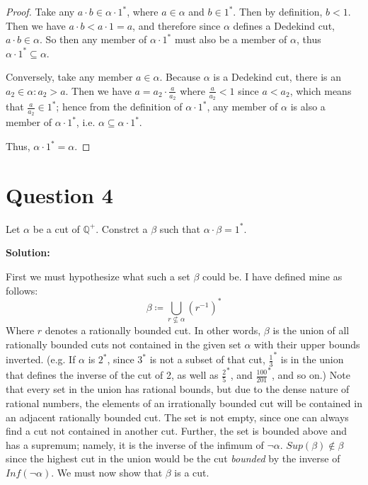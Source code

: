 \documentclass[12pt, letterpaper]{article}
\begin{document}
\begin{proof}

\noindent Take any $a \cdot b \in \alpha \cdot 1^*$, where $a \in \alpha$ and $b \in 1^*$. Then by definition, $b < 1$. Then we have $a \cdot b < a \cdot 1 = a$,
and therefore since $\alpha$ defines a Dedekind cut, $a \cdot b \in \alpha$. So then any member of $\alpha \cdot 1^*$ must also be a member of $\alpha$, thus
$\alpha \cdot 1^* \subseteq \alpha$.

\noindent Conversely, take any member $a \in \alpha$. Because $\alpha$ is a Dedekind cut, there is an $a_2 \in \alpha : a_2 > a$.
Then we have $a = a_2 \cdot \frac{a}{a_2}$ where $\frac{a}{a_2} < 1$ since $a < a_2$, which means that $\frac{a}{a_2} \in 1^*$; hence from the definition of $\alpha \cdot 1^*$, any member of
$\alpha$ is also a member of $\alpha \cdot 1^*$, i.e. $\alpha \subseteq \alpha \cdot 1^*$.

\noindent Thus, $\alpha \cdot 1^* = \alpha$.

\end{proof}
\pagebreak
\section*{Question 4}
Let $\alpha$ be a cut of $\mathbb{Q}^+$. Constrct a $\beta$ such that $\alpha \cdot \beta = 1^*$.

\noindent\textbf{Solution:}

\noindent First we must hypothesize what such a set $\beta$ could be. I have defined mine as follows:
$$\beta \coloneqq \bigcup\limits_{r \nsubseteq \alpha} (r^{-1})^*$$
Where $r$ denotes a rationally bounded cut. In other words, $\beta$ is the union of all rationally bounded cuts not contained in the given set $\alpha$ with their upper bounds inverted.
(e.g. If $\alpha$ is $2^*$, since $3^*$ is not a subset of that cut, $\frac{1}{3}^*$
is in the union that defines the inverse of the cut of 2, as well as $\frac{2}{5}^*$, and $\frac{100}{201}^*$, and so on.) Note that every set in the union has rational bounds,
but due to the dense nature of rational numbers, the elements of an irrationally bounded cut will be contained in an adjacent rationally bounded cut. The set is not empty, since one can always find a cut not contained in another cut. Further,
the set is bounded above and has a supremum; namely, it is the inverse of the infimum of $\neg \alpha$. $Sup(\beta) \notin \beta$ since the highest cut in the union would be the cut \textit{bounded} by the inverse of $Inf(\neg \alpha)$.
We must now show that $\beta$ is a cut.
\end{document}
